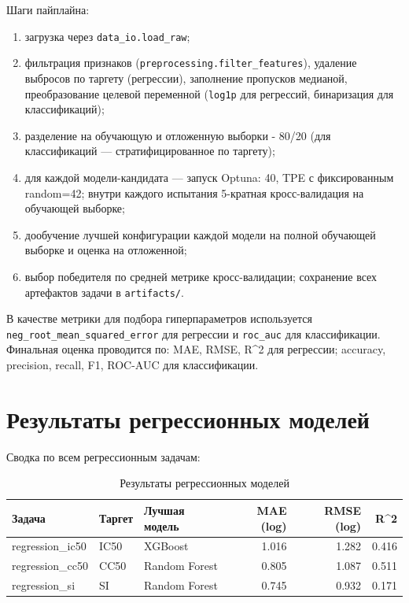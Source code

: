 \documentclass[12pt,a4paper]{report}
\begin{document}
Шаги пайплайна:
\begin{enumerate}
    \item загрузка через \texttt{data\_io.load\_raw};
    \item фильтрация признаков (\texttt{preprocessing.filter\_features}), удаление выбросов по таргету (регрессии), заполнение пропусков медианой, преобразование целевой переменной (\texttt{log1p} для регрессий, бинаризация для классификаций);
    \item разделение на обучающую и отложенную выборки - 80/20 (для классификаций --- стратифицированное по таргету);
    \item для каждой модели-кандидата --- запуск Optuna: 40, TPE с фиксированным random=42; внутри каждого испытания 5-кратная кросс-валидация на обучающей выборке;
    \item дообучение лучшей конфигурации каждой модели на полной обучающей выборке и оценка на отложенной;
    \item выбор победителя по средней метрике кросс-валидации; сохранение всех артефактов задачи в \texttt{artifacts/}.
\end{enumerate}

В качестве метрики для подбора гиперпараметров используется \texttt{neg\_root\_mean\_squared\_error} для регрессии и \texttt{roc\_auc} для классификации. Финальная оценка проводится по: MAE, RMSE, R\^{}2 для регрессии; accuracy, precision, recall, F1, ROC-AUC для классификации.

\chapter{Результаты регрессионных моделей}

Сводка по всем регрессионным задачам: 
\begin{table}[H]
\centering
\caption{Результаты регрессионных моделей}
\label{tab:reg_summary}
\begin{tabular}{lllrrr}
\toprule
Задача & Таргет & Лучшая модель & MAE (log) & RMSE (log) & R\^{}2 \\
\midrule
regression\_ic50 & IC50 & XGBoost        & 1.016 & 1.282 & 0.416 \\
regression\_cc50 & CC50 & Random Forest  & 0.805 & 1.087 & 0.511 \\
regression\_si   & SI   & Random Forest  & 0.745 & 0.932 & 0.171 \\
\bottomrule
\end{tabular}
\end{table}
\end{document}
